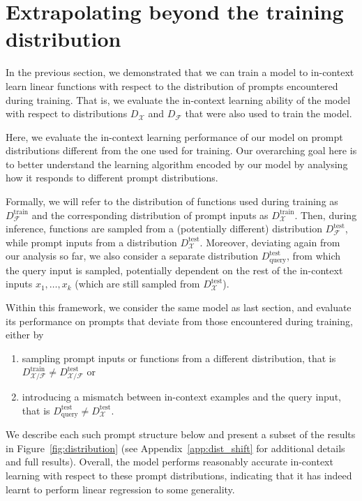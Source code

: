 \documentclass{article}
\begin{document}
\section{Extrapolating beyond the training distribution}
\label{sec:distribution_shifts}

In the previous section, we demonstrated that we can train a model to in-context learn linear functions with respect to the distribution of prompts encountered during training.
That is,  we evaluate the in-context learning ability of the model with respect to distributions $D_\mathcal{X}$ and $D_\mathcal{F}$ that were also used to train the model.

Here, we evaluate the in-context learning performance of our model on prompt distributions different from the one used for training.
Our overarching goal here is to better understand the learning algorithm encoded by our model by analysing how it responds to different prompt distributions.

Formally, we will refer to the distribution of functions used during training as $D_\mathcal{F}^\text{train}$ and the corresponding distribution of prompt inputs as $D_\mathcal{X}^\text{train}$.
Then, during inference, functions are sampled from a (potentially different) distribution $D_\mathcal{F}^\text{test}$, while prompt inputs from a distribution $D_\mathcal{X}^\text{test}$.
Moreover, deviating again from our analysis so far, we also consider a separate distribution  $D_\text{query}^\text{test}$, from which the query input is sampled, potentially dependent on the rest of the in-context inputs $x_1,\ldots,x_k$ (which are still sampled from   $D_\mathcal{X}^\text{test}$).

Within this framework, we consider the same model as last section, and evaluate its performance on prompts that deviate from those encountered during training, either by
\begin{enumerate}
    \item sampling prompt inputs or functions from a different distribution, that is $D_{\mathcal{X/F}}^\text{train}\neq D_{\mathcal{X/F}}^\text{test}$ or
    \item introducing a mismatch between in-context examples and the query input, that is $D_\text{query}^\text{test} \neq D_\mathcal{X}^\text{test}$.
\end{enumerate}
We describe each such prompt structure below and present a subset of the results in Figure~\ref{fig:distribution} (see Appendix~\ref{app:dist_shift} for additional details and full results). 
Overall, the model performs reasonably accurate in-context learning with respect to these prompt distributions, indicating that it has indeed learnt to perform linear regression to some generality.
\end{document}
